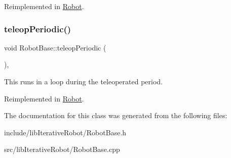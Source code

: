 Reimplemented in \mbox{\hyperlink{class_robot_a8fc4fbb8f758d7223d062e1b4a915232}{Robot}}.

\mbox{\label{classlib_iterative_robot_1_1_robot_base_a564ee86d582b598dd0713c067b352aef}} 
\subsubsection{\texorpdfstring{teleopPeriodic()}{teleopPeriodic()}}
{\footnotesize\ttfamily void Robot\+Base\+::teleop\+Periodic (\begin{DoxyParamCaption}{ }\end{DoxyParamCaption})\hspace{0.3cm}{\ttfamily [protected]}, {\ttfamily [virtual]}}

This runs in a loop during the teleoperated period. 

Reimplemented in \mbox{\hyperlink{class_robot_a78f62f5d6eb05e27bfa1998fc35a519c}{Robot}}.



The documentation for this class was generated from the following files\+:\begin{DoxyCompactItemize}
\item 
include/lib\+Iterative\+Robot/Robot\+Base.\+h\item 
src/lib\+Iterative\+Robot/Robot\+Base.\+cpp\end{DoxyCompactItemize}
